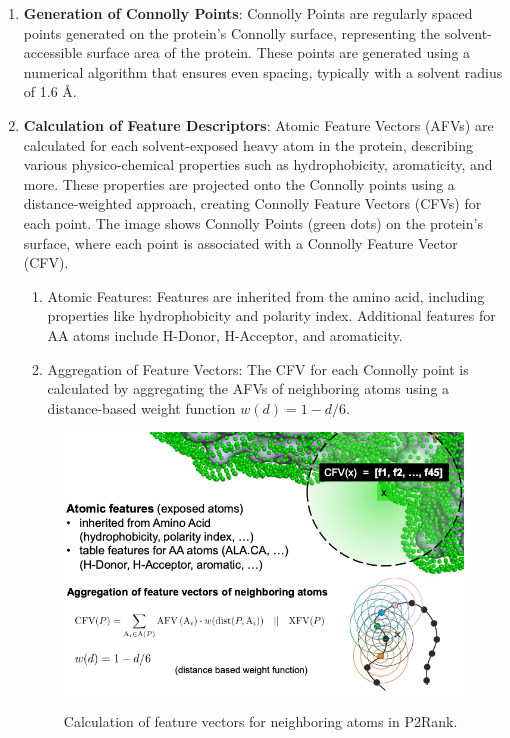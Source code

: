 \begin{enumerate} 
    \item \textbf{Generation of Connolly Points}: Connolly Points are regularly spaced points generated on the protein’s Connolly surface, representing the solvent-accessible surface area of the protein. These points are generated using a numerical algorithm that ensures even spacing, typically with a solvent radius of 1.6 Å.
    \item \textbf{Calculation of Feature Descriptors}: Atomic Feature Vectors (AFVs) are calculated for each solvent-exposed heavy atom in the protein, describing various physico-chemical properties such as hydrophobicity, aromaticity, and more. These properties are projected onto the Connolly points using a distance-weighted approach, creating Connolly Feature Vectors (CFVs) for each point. The image shows Connolly Points (green dots) on the protein’s surface, where each point is associated with a Connolly Feature Vector (CFV).
    \begin{enumerate}
        \item Atomic Features: Features are inherited from the amino acid, including properties like hydrophobicity and polarity index. Additional features for AA atoms include H-Donor, H-Acceptor, and aromaticity.
        \item Aggregation of Feature Vectors: The CFV for each Connolly point is calculated by aggregating the AFVs of neighboring atoms using a distance-based weight function $w(d) = 1 - d / 6$.
    \end{enumerate}
        \begin{figure}[hbt]
            \centering
            \begin{minipage}[t]{.9\textwidth}
            \caption{Calculation of feature vectors for neighboring atoms in P2Rank.}
            \includegraphics[width=1\textwidth]{img/slide_p2rank.png}\\

\end{minipage}
\end{figure}
\end{enumerate}

